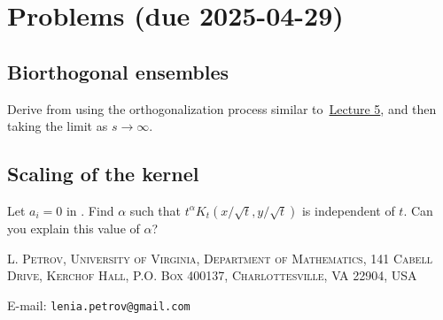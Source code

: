 \documentclass[letterpaper,11pt,oneside,reqno]{article}
\numberwithin{equation}{section}
\theoremstyle{definition}
\begin{document}
\appendix
\setcounter{section}{10}

\section{Problems (due 2025-04-29)}


\subsection{Biorthogonal ensembles}
\label{prob:biorthogonal}

Derive  from
using the orthogonalization process similar
to~\href{https://lpetrov.cc/rmt25/rmt25-notes/rmt2025-l05.pdf}{Lecture 5},
and then taking the limit as $s\to\infty$.

\subsection{Scaling of the kernel}
\label{prob:scaling}

Let $a_i=0$ in .
Find $\alpha$ such that
$t^\alpha K_t(x/\sqrt{t},y/\sqrt{t})$ is independent of $t$.
Can you explain this value of $\alpha$?









\medskip

\textsc{L. Petrov, University of Virginia, Department of Mathematics, 141 Cabell Drive, Kerchof Hall, P.O. Box 400137, Charlottesville, VA 22904, USA}

E-mail: \texttt{lenia.petrov@gmail.com}
\end{document}
